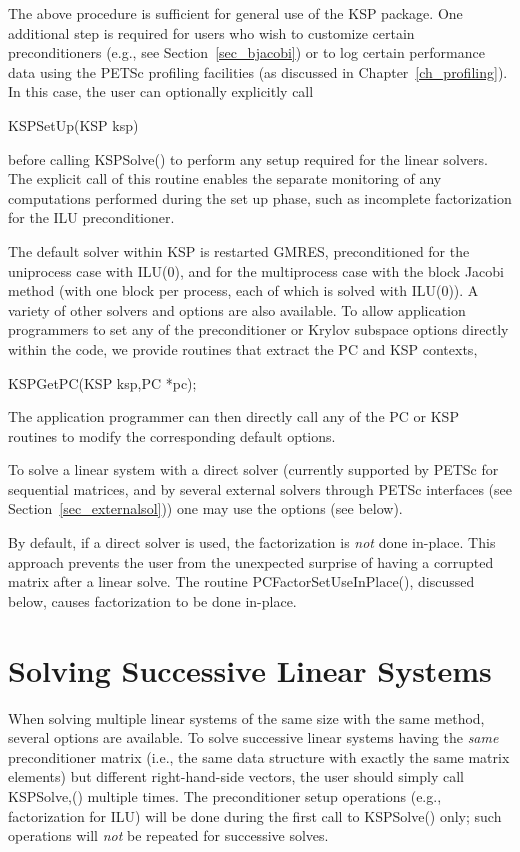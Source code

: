 The above procedure is sufficient for general use of the KSP package.
One additional step is required for users who wish to customize certain
preconditioners (e.g., see Section~\ref{sec_bjacobi}) or to log certain
performance data using the PETSc profiling facilities (as discussed in
Chapter~\ref{ch_profiling}).
In this case, the user can optionally explicitly call
\begin{tabbing}
  KSPSetUp(KSP ksp)
\end{tabbing}
before calling KSPSolve() to perform any setup required for
the linear solvers.  The explicit call of this routine enables the
separate monitoring of any computations performed during the set up
phase, such as incomplete factorization for the ILU preconditioner.

The default solver within KSP is restarted GMRES, preconditioned for
the uniprocess case with ILU(0), and for the multiprocess case
with the block Jacobi method (with one block per process, each of
which is solved with ILU(0)). A variety of other solvers
and options are also available.
To allow application programmers to set any of the preconditioner or
Krylov subspace options directly within the code, we provide routines
that extract the PC and KSP contexts,
\begin{tabbing}
  KSPGetPC(KSP ksp,PC *pc);\\
\end{tabbing}
The application programmer can then directly call any of the PC or KSP
routines to modify the corresponding default options.

To solve a linear system with a direct solver (currently supported
by PETSc for sequential matrices, and by several external solvers through
PETSc interfaces (see Section~\ref{sec_externalsol})) one may use the options
   
(see below).

By default, if a direct solver is used, the factorization is {\em not} done
in-place. This approach prevents the user from the unexpected surprise
of having a corrupted matrix after a linear solve. The routine
PCFactorSetUseInPlace(), discussed below, causes factorization to
be done in-place.

\section{Solving Successive Linear Systems}

When solving multiple linear systems of the same size with the same
method, several options are available.  To solve successive linear
systems having the {\em same} preconditioner matrix (i.e., the same
data structure with exactly the same matrix elements) but different
right-hand-side vectors, the user should simply call KSPSolve,()
multiple times.  The preconditioner setup operations (e.g.,
factorization for ILU) will be done during the first call to KSPSolve() only; such operations will {\em not} be repeated for
successive solves.

